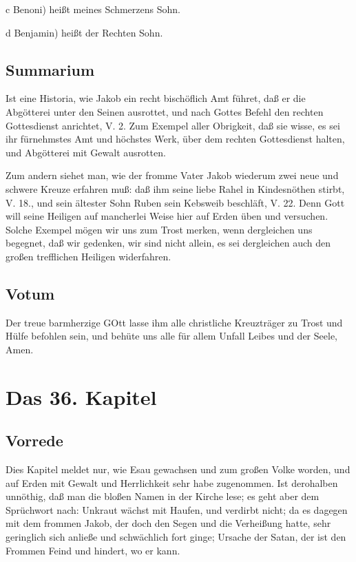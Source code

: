 c Benoni) heißt meines Schmerzens Sohn.

d Benjamin) heißt der Rechten Sohn.

\section{Summarium}

Ist eine Historia, wie Jakob ein recht bischöflich Amt führet, daß er die Abgötterei unter den Seinen ausrottet, und nach Gottes Befehl den rechten Gottesdienst anrichtet, V. 2. Zum Exempel aller Obrigkeit, daß sie wisse, es sei ihr fürnehmstes Amt und höchstes Werk, über dem rechten Gottesdienst halten, und Abgötterei mit Gewalt ausrotten.

Zum andern siehet man, wie der fromme Vater Jakob wiederum zwei neue und schwere Kreuze erfahren muß: daß ihm seine liebe Rahel in Kindesnöthen stirbt, V. 18., und sein ältester Sohn Ruben sein Kebsweib beschläft, V. 22. Denn Gott will seine Heiligen auf mancherlei Weise hier auf Erden üben und versuchen. Solche Exempel mögen wir uns zum Trost merken, wenn dergleichen uns begegnet, daß wir gedenken, wir sind nicht allein, es sei dergleichen auch den großen trefflichen Heiligen widerfahren.

\section{Votum}

Der treue barmherzige GOtt lasse ihm alle christliche Kreuzträger zu Trost und Hülfe befohlen sein, und behüte uns alle für allem Unfall Leibes und der Seele, Amen.

\chapter{Das 36. Kapitel}

\section{Vorrede}

Dies Kapitel meldet nur, wie Esau gewachsen und zum großen Volke worden, und auf Erden mit Gewalt und Herrlichkeit sehr habe zugenommen. Ist derohalben unnöthig, daß man die bloßen Namen in der Kirche lese; es geht aber dem Sprüchwort nach: Unkraut wächst mit Haufen, und verdirbt nicht; da es dagegen mit dem frommen Jakob, der doch den Segen und die Verheißung hatte, sehr geringlich sich anließe und schwächlich fort ginge; Ursache der Satan, der ist den Frommen Feind und hindert, wo er kann.

